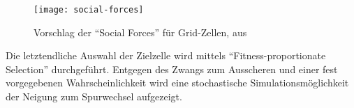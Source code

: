 \begin{figure}[hptb]
 \centering
 \texttt{[image: social-forces]}
 \caption[\enquote{Social Forces} für Grid-Zellen]{Vorschlag der \enquote{Social Forces} für Grid-Zellen, aus \cite{dat-ba}}
 \label{figure:social-forces}
\end{figure}

Die letztendliche Auswahl der Zielzelle wird mittels \enquote{Fitness-proportionate Selection} durchgeführt.
Entgegen des Zwangs zum Ausscheren und einer fest vorgegebenen Wahrscheinlichkeit wird eine stochastische Simulationsmöglichkeit der Neigung zum Spurwechsel aufgezeigt.